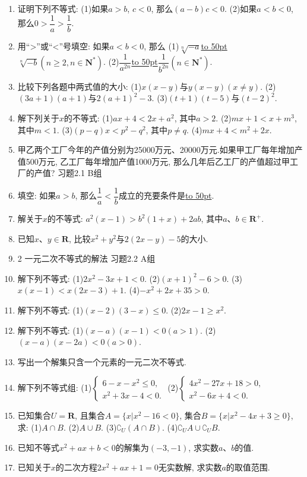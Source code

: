 \documentclass[10pt,a4paper]{article}
\newcommand{\blank}[1]{\underline{\hbox to #1pt{}}}
\begin{document}
\begin{enumerate}[1.]
\item 证明下列不等式:
(1)如果$a>b$, $c<0$, 那么$(a-b)c<0$.
(2)如果$a<b<0$, 那么$0>\dfrac 1a>\dfrac 1b$.
\item 用``>''或``<''号填空:
如果$a<b<0$, 那么
(1)$\sqrt [n]{-a}$\blank{50}$\sqrt [n]{-b}(n\ge 2,n\in \mathbf{N}^*)$.
(2)$\dfrac 1{a^{2n}}$\blank{50}$\dfrac 1{b^{2n}}(n\in \mathbf{N}^*)$.
\item 比较下列各题中两式值的大小:
(1)$x(x-y)$与$y(x-y)(x\ne y)$.
(2)$(3a+1)(a+1)$与$2(a+1)^2-3$.
(3)$(t+1)(t-5)$与$(t-2)^2$.
\item 解下列关于$x$的不等式:
(1)$ax+4<2x+a^2$, 其中$a>2$.
(2)$mx+1<x+m^3$, 其中$m<1$.
(3)$(p-q)x<p^2-q^2$, 其中$p\ne q$.
(4)$mx+4<m^2+2x$.
\item 甲乙两个工厂今年的产值分别为25000万元、20000万元.如果甲工厂每年增加产值500万元, 乙工厂每年增加产值1000万元, 那么几年后乙工厂的产值超过甲工厂的产值?
习题2.1  B组
\item 填空:
如果$a>b$, 那么$\dfrac 1a<\dfrac 1b$成立的充要条件是\blank{50}.
\item 解关于$x$的不等式: $a^2(x-1)>b^2(1+x)+2ab$, 其中$a$、$b\in \mathbf{R}^+$.
\item 已知$x$、$y\in \mathbf{R}$, 比较$x^2+y^2$与$2(2x-y)-5$的大小.
\item 2 一元二次不等式的解法
习题2.2  A组
\item 解下列不等式:
(1)$2x^2-3x+1<0$.			(2)$(x+1)^2-6>0$.
(3)$x(x-1)<x(2x-3)+1$.	(4)$-x^2+2x+35>0$.
\item 解下列不等式:
(1)$(x-2)(3-x)\le 0$.				(2)$2x-1\ge x^2$.
\item 解下列不等式:
(1)$(x-a)(x-1)<0(a>1)$.		(2)$(x-a)(x-2a)<0(a>0)$.
\item 写出一个解集只含一个元素的一元二次不等式.
\item 解下列不等式组:
(1)$\begin{cases} 6-x-x^2\le 0, \\ x^2+3x-4<0. \end{cases}$			(2)$\begin{cases} 4x^2-27x+18>0, \\ x^2-6x+4<0. \end{cases}$
\item 已知集合$U=\mathbf{R}$, 且集合$A=\{x|x^2-16<0\}$, 集合$B=\{x|x^2-4x+3\ge 0\}$, 求:
(1)$A\cap B$.
(2)$A\cup B$.
(3)$\complement _U(A\cap B)$.
(4)$\complement _UA\cup \complement _UB$.
\item 已知不等式$x^2+ax+b<0$的解集为$(-3,-1)$, 求实数$a$、$b$的值.
\item 已知关于$x$的二次方程$2x^2+ax+1=0$无实数解, 求实数$a$的取值范围.

\end{enumerate}
\end{document}
